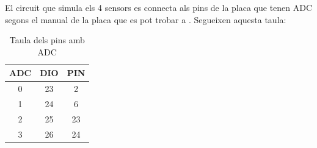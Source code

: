 El circuit que simula els 4 sensors es connecta als pins de la placa que tenen ADC segons el manual de la placa que es pot trobar a \cite{manual_placa}.
Segueixen aquesta taula:

\begin{table}[!h]
	\begin{center}
		\begin{tabular}{|c|c|c|}
			\hline
			ADC			&	DIO		& 	PIN		\\	\hline
			0			&	23		&	2		\\	\hline
			1			&	24		&	6		\\	\hline
			2			&	25		&	23		\\	\hline
			3			&	26		&	24		\\	\hline
		\end{tabular}
	\end{center}
	\caption{Taula dels pins amb ADC}
\end{table}
